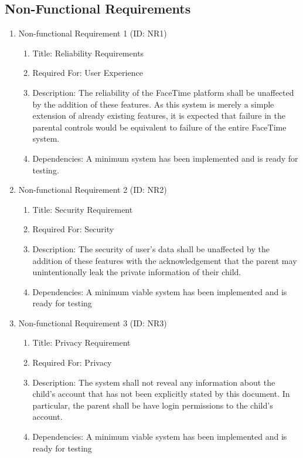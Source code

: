 \documentclass[12pt]{article}
\begin{document}
\subsection{Non-Functional Requirements}

\begin{enumerate}
    \item Non-functional Requirement 1 (ID: NR1)
    \begin{enumerate}
        \item Title: Reliability Requirements
        \item Required For: User Experience
        \item Description: The reliability of the FaceTime platform shall be unaffected by the addition of these
        features. As this system is merely a simple extension of already existing features, it is expected that
        failure in the parental controls would be equivalent to failure of the entire FaceTime system.
        \item Dependencies: A minimum system has been implemented and is ready for testing.
    \end{enumerate}
    \item Non-functional Requirement 2 (ID: NR2)
    \begin{enumerate}
        \item Title: Security Requirement
        \item Required For: Security
        \item Description:  The security of user’s data shall be unaffected by the addition of these features
        with the acknowledgement that the parent may unintentionally leak the private information of their child.
        \item Dependencies: A minimum viable system has been implemented and is ready for testing
    \end{enumerate}
    \item Non-functional Requirement 3 (ID: NR3)
    \begin{enumerate}
        \item Title: Privacy Requirement
        \item Required For: Privacy
        \item Description:  The system shall not reveal any information about the child’s account that has not been
        explicitly stated by this document. In particular, the parent shall be have login permissions to the child’s account.
        \item Dependencies: A minimum viable system has been implemented and is ready for testing

\end{enumerate}
\end{enumerate}
\end{document}

